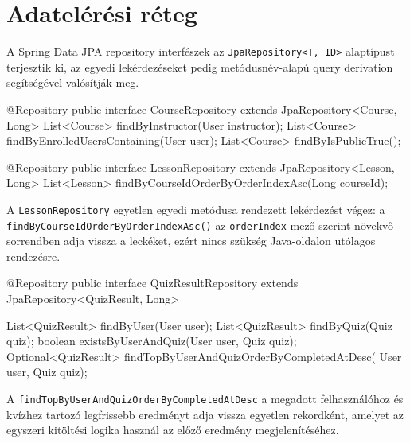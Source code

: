 \section{Adatelérési réteg}

A Spring Data JPA repository interfészek az \texttt{JpaRepository<T, ID>} alaptípust terjesztik ki, az egyedi lekérdezéseket pedig metódusnév-alapú query derivation segítségével valósítják meg.

\begin{java}[caption={A CourseRepository és a LessonRepository},label=java:repos]
@Repository
public interface CourseRepository extends JpaRepository<Course, Long> {
    List<Course> findByInstructor(User instructor);
    List<Course> findByEnrolledUsersContaining(User user);
    List<Course> findByIsPublicTrue();
}

@Repository
public interface LessonRepository extends JpaRepository<Lesson, Long> {
    List<Lesson> findByCourseIdOrderByOrderIndexAsc(Long courseId);
}
\end{java}

A \texttt{LessonRepository} egyetlen egyedi metódusa rendezett lekérdezést végez: a \texttt{findByCourseIdOrderByOrderIndexAsc()} az \texttt{orderIndex} mező szerint növekvő sorrendben adja vissza a leckéket, ezért nincs szükség Java-oldalon utólagos rendezésre.

\begin{java}[caption={A QuizResultRepository egyedi metódusai},label=java:quizresultrepo]
@Repository
public interface QuizResultRepository
        extends JpaRepository<QuizResult, Long> {

    List<QuizResult> findByUser(User user);
    List<QuizResult> findByQuiz(Quiz quiz);
    boolean existsByUserAndQuiz(User user, Quiz quiz);
    Optional<QuizResult> findTopByUserAndQuizOrderByCompletedAtDesc(
            User user, Quiz quiz);
}
\end{java}

A \texttt{findTopByUserAndQuizOrderByCompletedAtDesc} a megadott felhasználóhoz és kvízhez tartozó legfrissebb eredményt adja vissza egyetlen rekordként, amelyet az egyszeri kitöltési logika használ az előző eredmény megjelenítéséhez.

